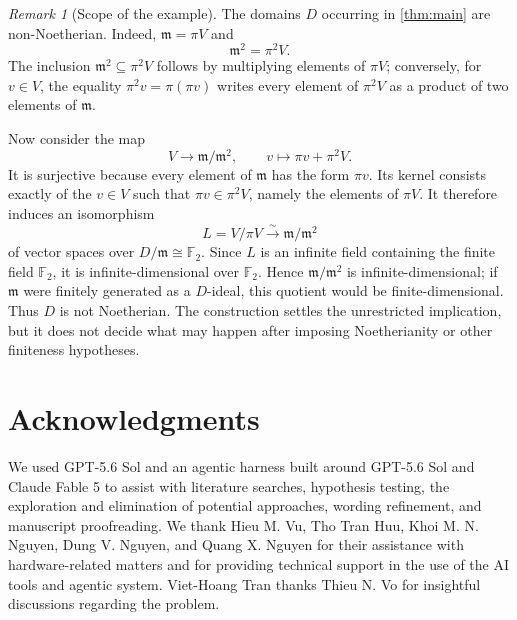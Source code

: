 \documentclass[11pt,reqno]{amsart}
\numberwithin{equation}{section}
\theoremstyle{plain}
\theoremstyle{definition}
\theoremstyle{remark}
\newtheorem{remark}[theorem]{Remark}
\newcommand{\F}{\mathbb F}
\newcommand{\m}{\mathfrak m}
\begin{document}
\begin{remark}[Scope of the example]\label{rem:scope}
The domains \(D\) occurring in \cref{thm:main} are non-Noetherian.
Indeed, \(\m=\pi V\) and
\[
 \m^2=\pi^2V.
\]
The inclusion \(\m^2\subseteq\pi^2V\) follows by multiplying elements
of \(\pi V\); conversely, for \(v\in V\), the equality
\(\pi^2v=\pi(\pi v)\) writes every element of \(\pi^2V\) as a product
of two elements of \(\m\).

Now consider the map
\[
 V\longrightarrow\m/\m^2,\qquad
 v\longmapsto\pi v+\pi^2V.
\]
It is surjective because every element of \(\m\) has the form
\(\pi v\).  Its kernel consists exactly of the \(v\in V\) such that
\(\pi v\in\pi^2V\), namely the elements of \(\pi V\).  It therefore
induces an isomorphism
\[
 L=V/\pi V\xrightarrow{\ \sim\ }\m/\m^2
\]
of vector spaces over
\(D/\m\cong\F _2\).  Since \(L\) is an infinite field containing
the finite field \(\F _2\), it is infinite-dimensional over
\(\F _2\).  Hence \(\m/\m^2\) is infinite-dimensional; if \(\m\)
were finitely generated as a \(D\)-ideal, this quotient would be
finite-dimensional.  Thus \(D\) is not Noetherian.  The construction
settles the unrestricted implication, but it does not decide what may
happen after imposing Noetherianity or other finiteness hypotheses.
\end{remark}

\renewcommand{\sectionname}{}
\section*{Acknowledgments}
We used GPT-5.6 Sol and an agentic harness built around GPT-5.6 Sol and Claude Fable 5 to assist with literature searches, hypothesis testing, the exploration and elimination of potential approaches, wording refinement, and manuscript proofreading. We thank Hieu M. Vu, Tho Tran Huu, Khoi M. N. Nguyen, Dung V. Nguyen, and Quang X. Nguyen for their assistance with hardware-related matters and for providing technical support in the use of the AI tools and agentic system. Viet-Hoang Tran thanks Thieu N. Vo for insightful discussions regarding the problem.



\begingroup
\footnotesize
\raggedright

\endgroup
\end{document}
